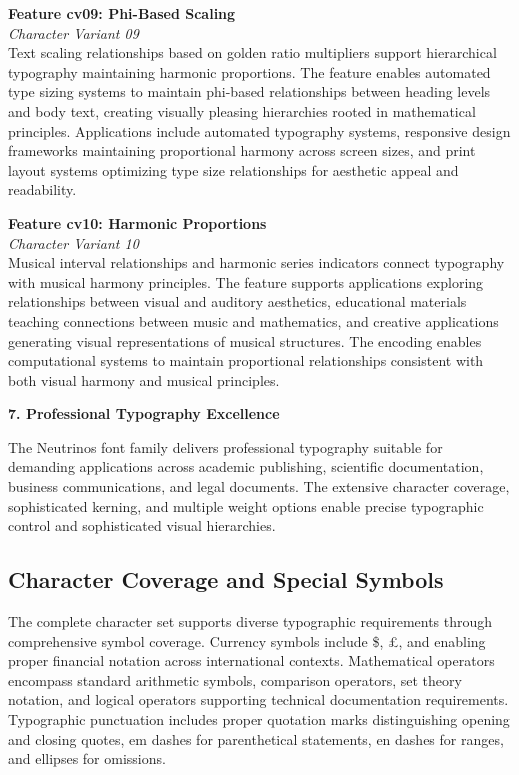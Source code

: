 \documentclass[11pt,letterpaper]{article}
\newcommand{\featurebox}[3]{%
\noindent
\colorbox{sectiongray}{%
\begin{minipage}{\dimexpr\textwidth-2\fboxsep}
\vspace{0.3em}
{\color{neutrinosblue}\large\textbf{#1}}\\[0.3em]
{\small\textit{#2}}\\[0.5em]
#3
\vspace{0.3em}
\end{minipage}}
\vspace{1em}
}
\newcommand{\sectionheader}[1]{%
\vspace{1em}
\noindent
\colorbox{neutrinosblue}{%
\begin{minipage}{\textwidth}
\vspace{0.3em}
{\color{white}\LARGE\textbf{#1}}
\vspace{0.3em}
\end{minipage}}
\vspace{0.5em}
}
\begin{document}
\featurebox{Feature cv09: Phi-Based Scaling}{Character Variant 09}{%
Text scaling relationships based on golden ratio multipliers support hierarchical typography maintaining harmonic proportions. The feature enables automated type sizing systems to maintain phi-based relationships between heading levels and body text, creating visually pleasing hierarchies rooted in mathematical principles. Applications include automated typography systems, responsive design frameworks maintaining proportional harmony across screen sizes, and print layout systems optimizing type size relationships for aesthetic appeal and readability.
}

\featurebox{Feature cv10: Harmonic Proportions}{Character Variant 10}{%
Musical interval relationships and harmonic series indicators connect typography with musical harmony principles. The feature supports applications exploring relationships between visual and auditory aesthetics, educational materials teaching connections between music and mathematics, and creative applications generating visual representations of musical structures. The encoding enables computational systems to maintain proportional relationships consistent with both visual harmony and musical principles.
}

\newpage

\sectionheader{7. Professional Typography Excellence}

The Neutrinos font family delivers professional typography suitable for demanding applications across academic publishing, scientific documentation, business communications, and legal documents. The extensive character coverage, sophisticated kerning, and multiple weight options enable precise typographic control and sophisticated visual hierarchies.

\subsection{Character Coverage and Special Symbols}

The complete character set supports diverse typographic requirements through comprehensive symbol coverage. Currency symbols include \$, \pounds, and \yen{} enabling proper financial notation across international contexts. Mathematical operators encompass standard arithmetic symbols, comparison operators, set theory notation, and logical operators supporting technical documentation requirements. Typographic punctuation includes proper quotation marks distinguishing opening and closing quotes, em dashes for parenthetical statements, en dashes for ranges, and ellipses for omissions.
\end{document}
